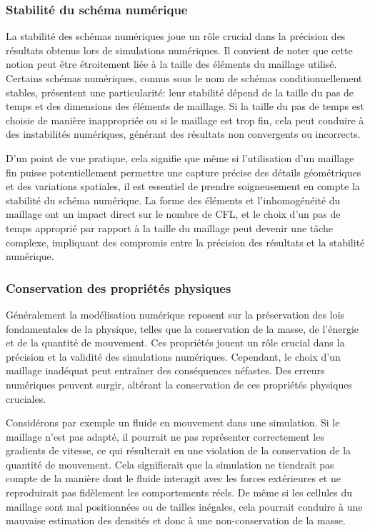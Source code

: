 \subsubsection{Stabilité du schéma numérique}

La stabilité des schémas numériques joue un rôle crucial dans la précision des résultats obtenus lors de simulations numériques. Il convient de noter que cette notion peut être étroitement liée à la taille des éléments du maillage utilisé. Certains schémas numériques, connus sous le nom de schémas conditionnellement stables, présentent une particularité: leur stabilité dépend de la taille du pas de temps et des dimensions des éléments de maillage. Si la taille du pas de temps est choisie de manière inappropriée ou si le maillage est trop fin, cela peut conduire à des instabilités numériques, générant des résultats non convergents ou incorrects.

D'un point de vue pratique, cela signifie que même si l'utilisation d'un maillage fin puisse potentiellement permettre une capture précise des détails géométriques et des variations spatiales, il est essentiel de prendre soigneusement en compte la stabilité du schéma numérique. La forme des éléments et l'inhomogénéité du maillage ont un impact direct sur le nombre de CFL, et le choix d'un pas de temps approprié par rapport à la taille du maillage peut devenir une tâche complexe, impliquant des compromis entre la précision des résultats et la stabilité numérique.


\subsubsection{Conservation des propriétés physiques}

Généralement la modélisation numérique reposent sur la préservation des lois fondamentales de la physique, telles que la conservation de la masse, de l'énergie et de la quantité de mouvement. Ces propriétés jouent un rôle crucial dans la précision et la validité des simulations numériques. Cependant, le choix d'un maillage inadéquat peut entraîner des conséquences néfastes. Des erreurs numériques peuvent surgir, altérant la conservation de ces propriétés physiques cruciales.

Considérons par exemple un fluide en mouvement dans une simulation. Si le maillage n'est pas adapté, il pourrait ne pas représenter correctement les gradients de vitesse, ce qui résulterait en une violation de la conservation de la quantité de mouvement. Cela signifierait que la simulation ne tiendrait pas compte de la manière dont le fluide interagit avec les forces extérieures et ne reproduirait pas fidèlement les comportements réels. De même si les cellules du maillage sont mal positionnées ou de tailles inégales, cela pourrait conduire à une mauvaise estimation des densités et donc à une non-conservation de la masse.


